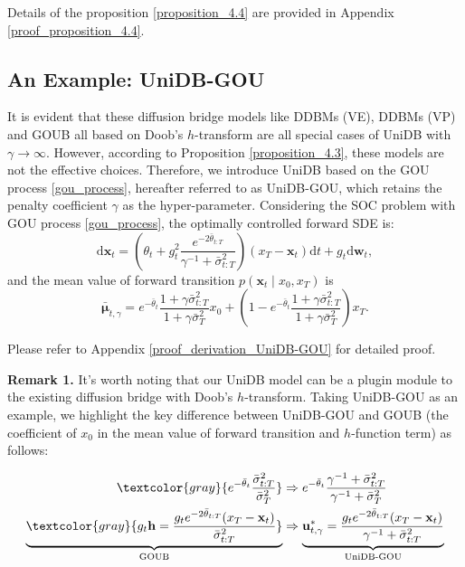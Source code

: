 \vspace{-2mm}
Details of the proposition \ref{proposition_4.4} are provided in Appendix \ref{proof_proposition_4.4}. 

\subsection{An Example: UniDB-GOU}\label{example}
It is evident that these diffusion bridge models like DDBMs (VE), DDBMs (VP) and GOUB all based on Doob's $h$-transform are all special cases of UniDB with $\gamma \rightarrow \infty$. However, according to Proposition \ref{proposition_4.3}, these models are not the effective choices. Therefore, we introduce UniDB based on the GOU process \eqref{gou_process}, hereafter referred to as UniDB-GOU, which retains the penalty coefficient $\gamma$ as the hyper-parameter. Considering the SOC problem with GOU process \eqref{gou_process}, the optimally controlled forward SDE is:
\begin{equation}\label{20}
\mathrm{d} \mathbf{x}_t = \left( \theta_t + g^2_t \frac{e^{-2\bar{\theta}_{t:T}}}{\gamma^{-1} + \bar{\sigma}^2_{t:T}}\right) (x_T - \mathbf{x}_t) \mathrm{d} t + g_t \mathrm{d} \mathbf{w}_t,
\end{equation}
and the mean value of forward transition $p(\mathbf{x}_t \mid x_0, x_T)$ is
\begin{equation}\label{21}
\bar{\boldsymbol{\mu}}_{t, \gamma} = e^{-\bar{\theta}_{t}} \frac{1 + \gamma \bar{\sigma}^2_{t:T}}{1 + \gamma \bar{\sigma}^2_{T}} x_0 + \left(1 - e^{-\bar{\theta}_{t}} \frac{1 + \gamma \bar{\sigma}^2_{t:T}}{1 + \gamma \bar{\sigma}^2_{T}}\right) x_T.
\end{equation}

Please refer to Appendix \ref{proof_derivation_UniDB-GOU} for detailed proof. 

\textbf{Remark 1.} It’s worth noting that our UniDB model can be a plugin module to the existing diffusion bridge with Doob's $h$-transform. Taking UniDB-GOU as an example, we highlight the key difference between UniDB-GOU and GOUB (the coefficient of $x_0$ in the mean value of forward transition and $h$-function term) as follows:

\vspace{-6mm}

\begin{equation}
\begin{aligned}
\textcolor{gray} {e^{-\bar{\theta}_{t}} \frac{\bar{\sigma}^2_{t:T}}{\bar{\sigma}^2_{T}}} & \Rightarrow e^{-\bar{\theta}_{t}} \frac{\gamma^{-1} + \bar{\sigma}^2_{t:T}}{\gamma^{-1} + \bar{\sigma}^2_{T}} \\
\underbrace{\textcolor{gray} {g_t\mathbf{h} = \frac{g_t e^{-2\bar{\theta}_{t:T}}(x_T - \mathbf{x}_t)}{\bar{\sigma}^2_{t:T}}}}_{\text{GOUB}} & \Rightarrow \underbrace{ \mathbf{u}_{t, \gamma}^{*} = \frac{g_t e^{-2\bar{\theta}_{t:T}}(x_T - \mathbf{x}_t)}{\gamma^{-1} + \bar{\sigma}^2_{t:T}}}_{\text{UniDB-GOU}}
\end{aligned}
\end{equation}

